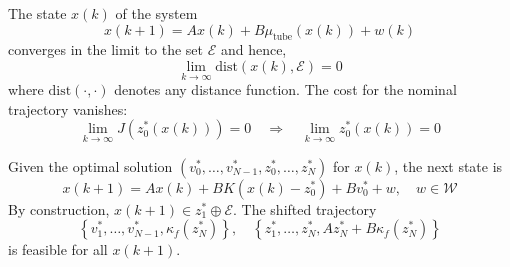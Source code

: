 The state $x(k)$ of the system
\begin{equation*}
    x(k + 1) = A x(k) + B \mu_{\text{tube}}(x(k)) + w(k)
\end{equation*}
converges in the limit to the set $\mathcal{E}$ and hence,
\begin{equation*}
    \lim_{k \to \infty} \text{dist}(x(k), \mathcal{E}) = 0
\end{equation*}
where $\text{dist}(\cdot, \cdot)$ denotes any distance function.
\newpar{}
The cost for the nominal trajectory vanishes:
\begin{equation*}
    \lim_{k \to \infty} J(z_0^*(x(k))) = 0 \quad \Rightarrow \quad \lim_{k \to \infty} z_0^*(x(k)) = 0
\end{equation*}

\begin{examplesection}

    Given the optimal solution $\left( v_0^*, \dots, v_{N-1}^*, z_0^*, \dots, z_N^* \right)$ for $x(k)$, the next state is
    \begin{equation*}
        x(k + 1) = A x(k) + B K(x(k) - z_0^*) + B v_0^* + w, \quad w \in \mathcal{W}
    \end{equation*}
    By construction, $x(k + 1) \in z_1^* \oplus \mathcal{E}$. The shifted trajectory
    \begin{equation*}
        \left\{ v_1^*, \dots, v_{N-1}^*, \kappa_f(z_N^*) \right\}, \quad \left\{ z_1^*, \dots, z_N^*, A z_N^* + B \kappa_f(z_N^*) \right\}
    \end{equation*}
    is feasible for all $x(k+1)$.


\end{examplesection}
